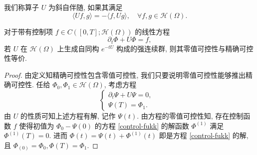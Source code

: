 \begin{definition}
 我们称算子 $U$ 为斜自伴随, 如果其满足
\begin{equation*}
    \langle Uf,g\rangle = - \langle f,Ug\rangle,\quad \forall f,g\in \mathcal{H}(\Omega).
\end{equation*}
\end{definition}

\begin{proposition}\label{null-equiv-exact}
对于带有控制项 $f\in C([0,T];\mathcal{H}(\Omega))$ 的线性方程
\begin{equation}
    \partial_t\Phi+U\Phi=f,\label{control-fukk}
\end{equation}
若 $U$ 在 $\mathcal{H}(\Omega)$ 上生成自同构 $e^{-tU}$ 构成的强连续群, 则其零值可控性与精确可控性等价.
\end{proposition}
\begin{proof}
由定义知精确可控性包含零值可控性, 我们只要说明零值可控性能够推出精确可控性. 任给 $\Phi_0,\Phi_1\in \mathcal{H}(\Omega)$, 考虑方程
\begin{equation}
    \left\lbrace
    \begin{array}{ll}
        \partial_t\Psi+U\Psi=0, &   \\
         \Psi(T)=\Phi_1.& 
    \end{array}
    \right.
\end{equation}
由 $U$ 的性质可知上述方程有解, 记作 $\Psi(t)$. 由方程的零值可控性知, 存在控制函数 $f$ 使得初值为 $\Phi_0-\Psi(0)$ 的方程 \eqref{control-fukk} 的解函数 $\Phi^{(1)}$ 满足 $\Phi^{(1)}(T)=0$. 进而 $\Phi(t)=\Psi(t)+\Phi^{(1)}(t)$ 即是方程 \eqref{control-fukk} 的解, 且 $\Phi_(0)=\Phi_0,\Phi(T)=\Phi_1$. 
\end{proof}


